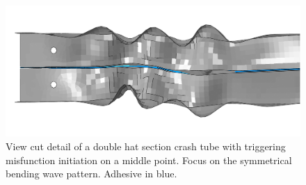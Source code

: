 \documentclass[
documentsize = a4, %
font = cmr, %
typesize = 11, %
printmode = true,
onehalfspacing = true,
language = en, %
titlepage = udciccp, %
degree = pt, %
dedication = true,
acknowledgements = true,
abstract-en = true,
abstract-es = false,
abstract-ga = false,
epigraphs = true,
toc = true,
lof = true,
lot = true,
frontmatterintoc = false,
notation = false,
minimal = false,
]{UDCthesis}
\begin{document}
\begin{figure}
	\centering
	\includegraphics[width=0.7\linewidth]{IMG_CUTRES/trig_misf_mid}
	\caption[View cut detail of a double hat section crash tube with triggering misfunction initiation on a middle point.]{View cut detail of a double hat section crash tube with triggering misfunction initiation on a middle point. Focus on the symmetrical bending wave pattern. Adhesive in blue.}
	\label{fig:trig_misf_mid}
\end{figure}

\end{document}
